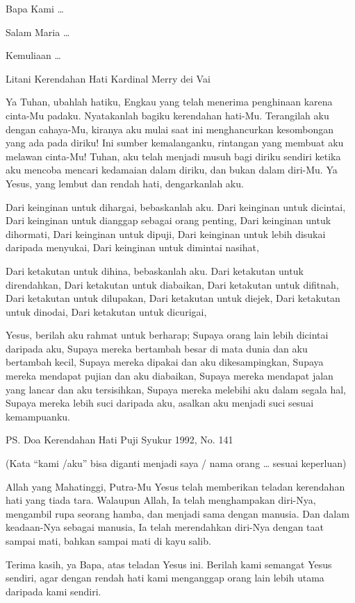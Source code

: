 \documentclass[a5paper,headsepline,titlepage,11pt,nnormalheadings,DIVcalc]{scrbook}
\begin{document}
Bapa Kami \ldots 

Salam Maria \ldots 

Kemuliaan \ldots

Litani Kerendahan Hati
Kardinal Merry dei Vai

Ya Tuhan, ubahlah hatiku, Engkau yang telah menerima penghinaan karena cinta-Mu padaku. Nyatakanlah bagiku kerendahan hati-Mu. Terangilah aku dengan cahaya-Mu, kiranya aku mulai saat ini menghancurkan kesombongan yang ada pada diriku! Ini sumber kemalanganku, rintangan yang membuat aku melawan cinta-Mu! Tuhan, aku telah menjadi musuh bagi diriku sendiri ketika aku mencoba mencari kedamaian dalam diriku, dan bukan dalam diri-Mu. Ya Yesus, yang lembut dan rendah hati, dengarkanlah aku.

Dari keinginan untuk dihargai,                                  bebaskanlah aku.
Dari keinginan untuk dicintai,
Dari keinginan untuk dianggap sebagai orang penting,
Dari keinginan untuk dihormati,
Dari keinginan untuk dipuji,
Dari keinginan untuk lebih disukai daripada menyukai,
Dari keinginan untuk dimintai nasihat,

Dari ketakutan untuk dihina,                                     bebaskanlah aku.                
Dari ketakutan untuk direndahkan,
Dari ketakutan untuk diabaikan,
Dari ketakutan untuk difitnah,
Dari ketakutan untuk dilupakan,
Dari ketakutan untuk diejek,
Dari ketakutan untuk dinodai,
Dari ketakutan untuk dicurigai,

Yesus, berilah aku rahmat untuk berharap;
Supaya orang lain lebih dicintai daripada aku,
Supaya mereka bertambah besar di mata dunia dan aku bertambah kecil,
Supaya mereka dipakai dan aku dikesampingkan,
Supaya mereka mendapat pujian dan aku diabaikan,
Supaya mereka mendapat jalan yang lancar dan aku tersisihkan,
Supaya mereka melebihi aku dalam segala hal,
Supaya mereka lebih suci daripada aku, asalkan aku menjadi suci sesuai kemampuanku.

 
\ps{Doa Kerendahan Hati}
Puji Syukur 1992, No. 141

(Kata “kami /aku” bisa diganti menjadi saya / nama orang … sesuai keperluan)

Allah yang Mahatinggi, Putra-Mu Yesus telah memberikan teladan kerendahan hati yang tiada tara. Walaupun Allah, Ia telah menghampakan diri-Nya, mengambil rupa seorang hamba, dan menjadi sama dengan manusia. Dan dalam keadaan-Nya sebagai manusia, Ia telah merendahkan diri-Nya dengan taat sampai mati, bahkan sampai mati di kayu salib.

Terima kasih, ya Bapa, atas teladan Yesus ini. Berilah kami semangat Yesus sendiri, agar dengan rendah hati kami menganggap orang lain lebih utama daripada kami sendiri.
\end{document}
